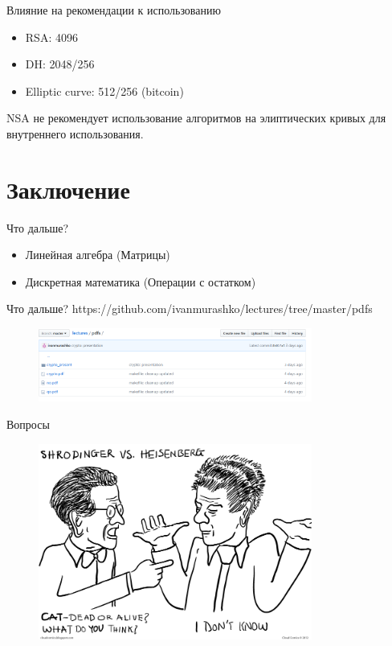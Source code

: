 \documentclass[10pt,pdf,hyperref={unicode}]{beamer}
\begin{document}
\begin{frame}{Влияние на рекомендации к использованию}
\begin{itemize}
\item RSA: 4096
\item DH: 2048/256
\item Elliptic curve: 512/256 (bitcoin) 
\end{itemize}

NSA не рекомендует использование алгоритмов на элиптических кривых для
внутреннего использования.
\end{frame}

\section{Заключение}
\begin{frame}{Что дальше?}
\begin{itemize}
\item Линейная алгебра (Матрицы)
\item Дискретная математика (Операции с остатком)
\end{itemize}
\end{frame}

\begin{frame}{Что дальше?}
https://github.com/ivanmurashko/lectures/tree/master/pdfs
 \begin{figure} 
   \includegraphics[width=90mm,scale=0.5]{github.png}
  \end{figure}
\end{frame}

\begin{frame}{Вопросы}
 \begin{figure} 
   \includegraphics[width=90mm,scale=0.5]{questions.png}
  \end{figure}
\end{frame}
\end{document}
